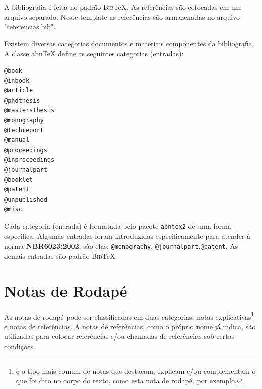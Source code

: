 A bibliografia é feita no padrão \textsc{Bib}\TeX{}. As referências são colocadas em um arquivo separado. Neste template as referências são armazenadas no arquivo "referencias.bib".

Existem diversas categorias documentos e materiais componentes da bibliografia. A classe abn\TeX{} define as seguintes categorias (entradas):

\begin{verbatim}
@book
@inbook
@article
@phdthesis
@mastersthesis
@monography
@techreport
@manual
@proceedings
@inproceedings
@journalpart
@booklet
@patent
@unpublished
@misc
\end{verbatim}

Cada categoria (entrada) é formatada pelo pacote \verb|abntex2| de uma forma específica. Algumas entradas foram introduzidas especificamente para atender à norma \textbf{NBR6023:2002}, são elas: \verb|@monography|, \verb|@journalpart|,\verb|@patent|. As demais entradas são padrão \textsc{Bib}\TeX{}.

\section{Notas de Rodapé}
\label{sec:notas_rodape}

As notas de rodapé pode ser classificadas em duas categorias: notas explicativas\footnote{é o tipo mais comum de notas que destacam, explicam e/ou complementam o que foi dito no corpo do texto, como esta nota de rodapé, por exemplo.} e notas de referências. A notas de referências, como o próprio nome já indica, são utilizadas para colocar referências e/ou chamadas de referências sob certas condições.